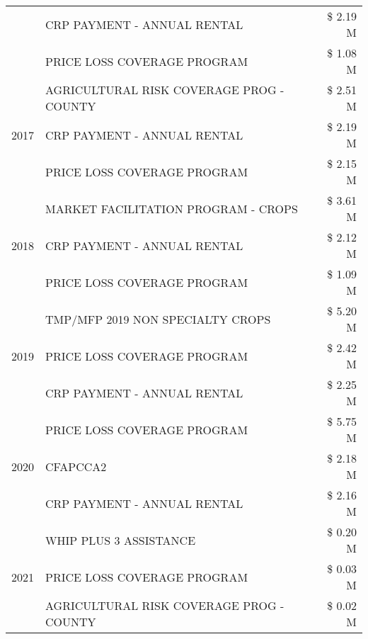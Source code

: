 \begin{tabular}{llr}
 & CRP PAYMENT - ANNUAL RENTAL & \$ 2.19 M \\
 & PRICE LOSS COVERAGE PROGRAM & \$ 1.08 M \\
\cline{1-3}
\multirow[t]{3}{*}{2017} & AGRICULTURAL RISK COVERAGE PROG - COUNTY & \$ 2.51 M \\
 & CRP PAYMENT - ANNUAL RENTAL & \$ 2.19 M \\
 & PRICE LOSS COVERAGE PROGRAM & \$ 2.15 M \\
\cline{1-3}
\multirow[t]{3}{*}{2018} & MARKET FACILITATION PROGRAM - CROPS & \$ 3.61 M \\
 & CRP PAYMENT - ANNUAL RENTAL & \$ 2.12 M \\
 & PRICE LOSS COVERAGE PROGRAM & \$ 1.09 M \\
\cline{1-3}
\multirow[t]{3}{*}{2019} & TMP/MFP 2019 NON SPECIALTY CROPS & \$ 5.20 M \\
 & PRICE LOSS COVERAGE PROGRAM & \$ 2.42 M \\
 & CRP PAYMENT - ANNUAL RENTAL & \$ 2.25 M \\
\cline{1-3}
\multirow[t]{3}{*}{2020} & PRICE LOSS COVERAGE PROGRAM & \$ 5.75 M \\
 & CFAPCCA2 & \$ 2.18 M \\
 & CRP PAYMENT - ANNUAL RENTAL & \$ 2.16 M \\
\cline{1-3}
\multirow[t]{3}{*}{2021} & WHIP PLUS 3 ASSISTANCE & \$ 0.20 M \\
 & PRICE LOSS COVERAGE PROGRAM & \$ 0.03 M \\
 & AGRICULTURAL RISK COVERAGE PROG - COUNTY & \$ 0.02 M \\
\cline{1-3}
\bottomrule
\end{tabular}
